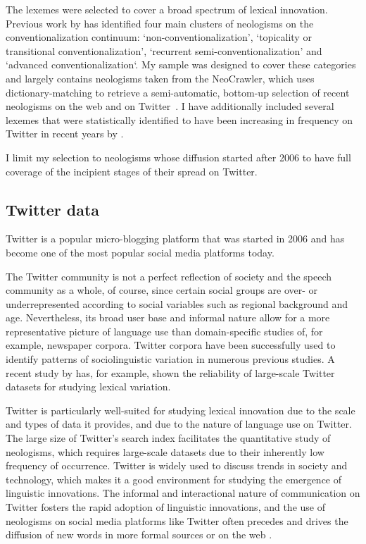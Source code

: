 \documentclass[
  a4paper,
  abstract=on,
  captions=tableabove
  ]{scrartcl}
\begin{document}
  The lexemes were selected to cover a broad spectrum of lexical innovation. Previous work by \textcite[115--147]{Kerremans2015WebNew} has identified four main clusters of neologisms on the conventionalization continuum: `non-conventionalization', `topicality or transitional conventionalization', `recurrent semi-conventionalization' and `advanced conventionalization`. My sample was designed to cover these categories and largely contains neologisms taken from the NeoCrawler, which uses dictionary-matching to retrieve a semi-automatic, bottom-up selection of recent neologisms on the web and on Twitter~\parencite{Kerremans2019UsingDatamining}. I have additionally included several lexemes that were statistically identified to have been increasing in frequency on Twitter in recent years by \textcite{Grieve2016AnalyzingLexical}.

  I limit my selection to neologisms whose diffusion started after 2006 to have full coverage of the incipient stages of their spread on Twitter.

  \subsection{Twitter data}
    \label{subsec:twitter-data}

    Twitter is a popular micro-blogging platform that was started in 2006 and has become one of the most popular social media platforms today.

    The Twitter community is not a perfect reflection of society and the speech community as a whole, of course, since certain social groups are over- or underrepresented according to social variables such as regional background and age. Nevertheless, its broad user base and informal nature allow for a more representative picture of language use than domain-specific studies of, for example, newspaper corpora. Twitter corpora have been successfully used to identify patterns of sociolinguistic variation in numerous previous studies. A recent study by \textcite{Grieve2019MappingLexical} has, for example, shown the reliability of large-scale Twitter datasets for studying lexical variation.

    Twitter is particularly well-suited for studying lexical innovation due to the scale and types of data it provides, and due to the nature of language use on Twitter. The large size of Twitter's search index facilitates the quantitative study of neologisms, which requires large-scale datasets due to their inherently low frequency of occurrence. Twitter is widely used to discuss trends in society and technology, which makes it a good environment for studying the emergence of linguistic innovations. The informal and interactional nature of communication on Twitter fosters the rapid adoption of linguistic innovations, and the use of neologisms on social media platforms like Twitter often precedes and drives the diffusion of new words in more formal sources or on the web \parencite{Wurschinger2016UsingWeb}.
\end{document}
